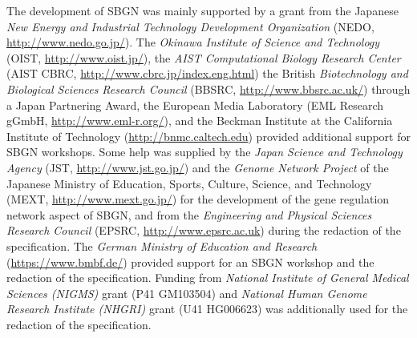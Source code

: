 The development of SBGN was mainly supported by a grant from the Japanese \emph{New Energy and Industrial Technology Development Organization} (NEDO, \url{http://www.nedo.go.jp/}).  The \emph{Okinawa Institute of Science and Technology} (OIST, \url{http://www.oist.jp/}), the \emph{AIST Computational Biology Research Center} (AIST CBRC, \url{http://www.cbrc.jp/index.eng.html}) the British \emph{Biotechnology and Biological Sciences Research Council} (BBSRC, \url{http://www.bbsrc.ac.uk/}) through a Japan Partnering Award, the European Media Laboratory (EML Research gGmbH, \url{http://www.eml-r.org/}), and the Beckman Institute at the California Institute of Technology (\url{http://bnmc.caltech.edu}) provided additional support for SBGN workshops. Some help was supplied by the \emph{Japan Science and Technology Agency} (JST, \url{http://www.jst.go.jp/}) and the \emph{Genome Network Project} of the Japanese Ministry of Education, Sports, Culture, Science, and Technology (MEXT, \url{http://www.mext.go.jp/}) for the development of the gene regulation network aspect of SBGN, and from the \emph{Engineering and Physical Sciences Research Council} (EPSRC, \url{http://www.epsrc.ac.uk}) during the redaction of the specification. The \emph{German Ministry of Education and Research} (\url{https://www.bmbf.de/}) provided support for an SBGN workshop and the redaction of the specification. Funding from \emph{National Institute of General Medical Sciences (NIGMS)} grant (P41 GM103504) and \emph{National Human Genome Research Institute (NHGRI)} grant (U41 HG006623) was additionally used for the redaction of the specification.
